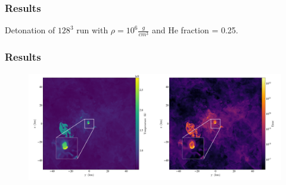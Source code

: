 \documentclass{beamer}
\begin{document}



\begin{frame}
	
	\frametitle{Results}
	\begin{center}
	\end{center}
	\begin{center} 
		Detonation of $128^{3}$ run with $\rho = 10^6 \frac{g}{cm^3}$ and He fraction = 0.25.
	\end{center}
\end{frame}



\begin{frame}
	\frametitle{Results}

        \begin{figure}
    \begin{center}
      \includegraphics[width=.90\linewidth]{combined_512_10e6_0.25_new.png}
    \end{center}
  \end{figure}


\end{frame}
\end{document}
